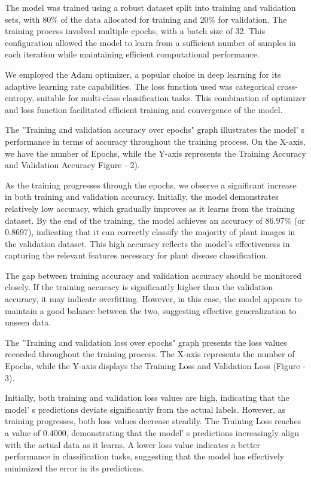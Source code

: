 \begin{multicols}{2}
The model was trained using a robust dataset split into training and
validation sets, with 80\% of the data allocated for training and 20\%
for validation. The training process involved multiple epochs, with a
batch size of 32. This configuration allowed the model to learn from a
sufficient number of samples in each iteration while maintaining
efficient computational performance.

We employed the Adam optimizer, a popular choice in deep learning for
its adaptive learning rate capabilities. The loss function used was
categorical cross-entropy, suitable for multi-class classification
tasks. This combination of optimizer and loss function facilitated
efficient training and convergence of the model.

The "Training and validation accuracy over epochs" graph illustrates the
model' s performance in terms of accuracy throughout the
training process. On the X-axis, we have the number of Epochs, while the
Y-axis represents the Training Accuracy and Validation Accuracy Figure
- 2).

As the training progresses through the epochs, we observe a significant
increase in both training and validation accuracy. Initially, the model
demonstrates relatively low accuracy, which gradually improves as it
learns from the training dataset. By the end of the training, the model
achieves an accuracy of 86.97\% (or 0.8697), indicating that it can
correctly classify the majority of plant images in the validation
dataset. This high accuracy reflects the model's effectiveness in
capturing the relevant features necessary for plant disease
classification.

The gap between training accuracy and validation accuracy should be
monitored closely. If the training accuracy is significantly higher than
the validation accuracy, it may indicate overfitting. However, in this
case, the model appears to maintain a good balance between the two,
suggesting effective generalization to unseen data.

The "Training and validation loss over epochs" graph presents the loss
values recorded throughout the training process. The X-axis represents
the number of Epochs, while the Y-axis displays the Training Loss and
Validation Loss (Figure - 3).

Initially, both training and validation loss values are high, indicating
that the model' s predictions deviate significantly from
the actual labels. However, as training progresses, both loss values
decrease steadily. The Training Loss reaches a value of 0.4000,
demonstrating that the model' s predictions increasingly
align with the actual data as it learns. A lower loss value indicates a
better performance in classification tasks, suggesting that the model
has effectively minimized the error in its predictions.


\end{multicols}
